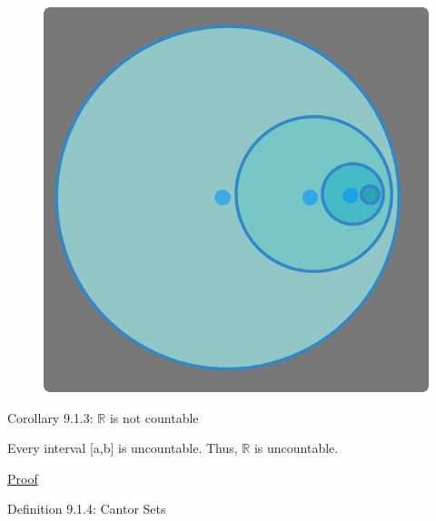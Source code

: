 \begin{figure}[h]
	\centering
	\includegraphics[scale=0.3]{Images/9.1.2.png}
\end{figure}

{ \color{orange} Corollary 9.1.3: $\mathbb{R}$ is not countable } 

	\begin{adjustbox}{minipage=14cm, right, vspace=0.1cm 0cm}
		Every interval [a,b] is uncountable.
		Thus, $\mathbb{R}$ is uncountable.
	\end{adjustbox}

{ \color{magenta} \underline{Proof} }


\newpage

{ \color{blue} Definition 9.1.4: Cantor Sets } 

